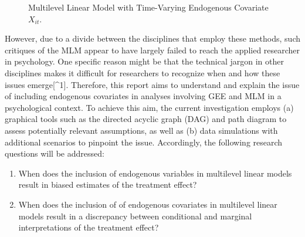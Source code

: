 \documentclass[
  12pt,
  a4paper,
]{article}
\begin{document}
\begin{figure}[H]

\caption{\label{fig-endogenous-example}Multilevel Linear Model with
Time-Varying Endogenous Covariate \(X_{it}\).}


\end{figure}%

However, due to a divide between the disciplines that employ these
methods, such critiques of the MLM appear to have largely failed to
reach the applied researcher in psychology. One specific reason might be
that the technical jargon in other disciplines makes it difficult for
researchers to recognize when and how these issues emerge{[}\^{}1{]}.
Therefore, this report aims to understand and explain the issue of
including endogenous covariates in analyses involving GEE and MLM in a
psychological context. To achieve this aim, the current investigation
employs (a) graphical tools such as the directed acyclic graph (DAG) and
path diagram to assess potentially relevant assumptions, as well as (b)
data simulations with additional scenarios to pinpoint the issue.
Accordingly, the following research questions will be addressed:

\begin{enumerate}
\def\labelenumi{(\arabic{enumi})}
\item
  When does the inclusion of endogenous variables in multilevel linear
  models result in biased estimates of the treatment effect?
\item
  When does the inclusion of of endogenous covariates in multilevel
  linear models result in a discrepancy between conditional and marginal
  interpretations of the treatment effect?
\end{enumerate}
\end{document}
